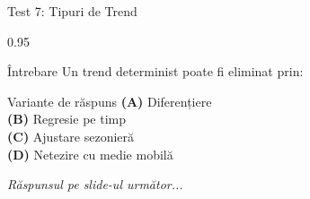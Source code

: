 \documentclass[9pt, aspectratio=169, t]{beamer}
\begin{document}
\begin{frame}{Test 7: Tipuri de Trend}
    \begin{cminipage}{0.95\textwidth}
    \begin{alertblock}{Întrebare}
        Un trend determinist poate fi eliminat prin:
    \end{alertblock}

    \vspace{0.4cm}

    \begin{block}{Variante de răspuns}
    \textcolor{MainBlue}{\textbf{(A)}} Diferențiere\\[3pt]
    \textcolor{MainBlue}{\textbf{(B)}} Regresie pe timp\\[3pt]
    \textcolor{MainBlue}{\textbf{(C)}} Ajustare sezonieră\\[3pt]
    \textcolor{MainBlue}{\textbf{(D)}} Netezire cu medie mobilă
    \end{block}
    \vspace{0.5cm}

    \begin{center}
        \textit{Răspunsul pe slide-ul următor...}
    \end{center}
    \end{cminipage}
\end{frame}
\end{document}
